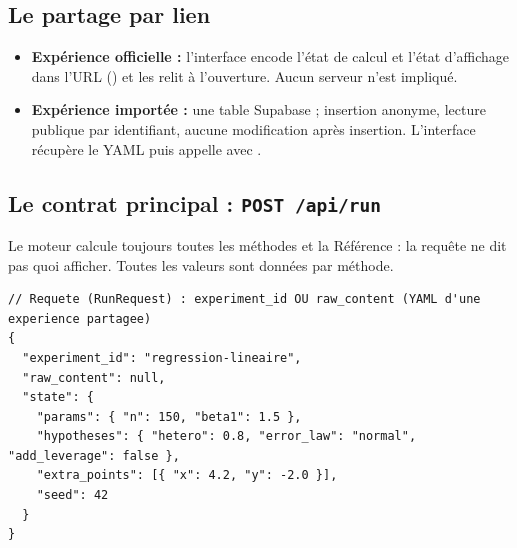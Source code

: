 \documentclass[11pt,a4paper]{article}
\begin{document}
\begin{appendices}
\subsection{Le partage par lien}
\begin{itemize}[leftmargin=*, nosep]
  \item \textbf{Expérience officielle :} l'interface encode l'état de calcul et l'état d'affichage dans l'URL () et les relit à l'ouverture. Aucun serveur n'est impliqué.
  \item \textbf{Expérience importée :} une table Supabase  ; insertion anonyme, lecture publique par identifiant, aucune modification après insertion. L'interface récupère le YAML puis appelle  avec .
\end{itemize}

\subsection{Le contrat principal : \texttt{POST /api/run}}
Le moteur calcule toujours toutes les méthodes et la Référence : la requête ne dit pas quoi afficher. Toutes les valeurs sont données par méthode.

\begin{lstlisting}[caption={Requête et réponse de \texttt{POST /api/run}.}]
// Requete (RunRequest) : experiment_id OU raw_content (YAML d'une experience partagee)
{
  "experiment_id": "regression-lineaire",
  "raw_content": null,
  "state": {
    "params": { "n": 150, "beta1": 1.5 },
    "hypotheses": { "hetero": 0.8, "error_law": "normal", "add_leverage": false },
    "extra_points": [{ "x": 4.2, "y": -2.0 }],
    "seed": 42
  }
}


\end{lstlisting}
\end{appendices}
\end{document}
